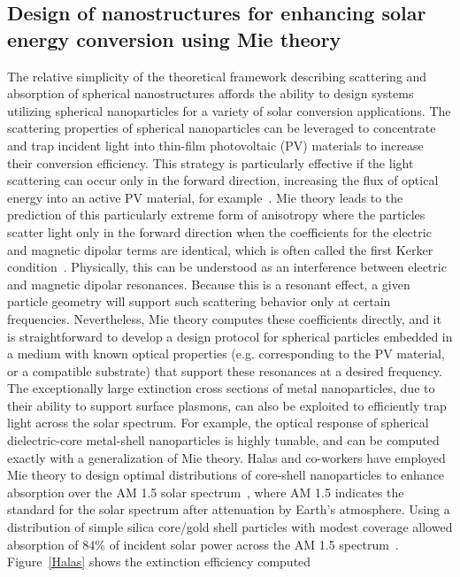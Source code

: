 \documentclass[review]{elsarticle}
\begin{document}
\subsection{Design of nanostructures for enhancing solar energy conversion using Mie theory}
The relative simplicity of the theoretical framework describing scattering and absorption of spherical 
nanostructures affords the ability to design
systems utilizing spherical nanoparticles for a variety of solar conversion applications.  The scattering properties of
spherical nanoparticles can be leveraged to concentrate and trap incident light into thin-film photovoltaic (PV) materials to increase their
conversion efficiency.  This strategy is particularly effective if the light scattering can occur only in the forward direction, increasing
the flux of optical energy into an active PV material, for example~\cite{AP_NatMat_2010}.
Mie theory
leads to the prediction of this particularly extreme form of anisotropy where the particles scatter light only in the
forward direction when the coefficients for the electric and magnetic dipolar terms are identical, which is often called the first Kerker condition~\cite{GGG_NatComm_2012}.
Physically, this can be understood as an interference between electric
and magnetic dipolar resonances.   Because this is a resonant effect, a given particle geometry will support such scattering behavior
only at certain frequencies.  Nevertheless, Mie theory computes these coefficients directly, and it is straightforward to develop a
design protocol for spherical particles embedded in a medium with known optical properties (e.g. corresponding to the PV material, or a
compatible substrate) that support these resonances at a desired frequency.  The exceptionally large extinction cross sections
of metal nanoparticles, due to their ability to support surface plasmons, can also be exploited to efficiently trap light across
the solar spectrum.  For example, the optical response of spherical dielectric-core metal-shell nanoparticles is highly tunable, and can be
computed exactly with a generalization of Mie theory.  Halas and co-workers have employed Mie theory to
design optimal distributions of core-shell nanoparticles to enhance absorption over the AM 1.5 solar 
spectrum~\cite{CH_APL_2006}, where AM 1.5 indicates the standard for the solar 
spectrum after attenuation by Earth's atmosphere.
Using a distribution of simple silica core/gold shell particles with modest coverage allowed absorption of 84\% of incident solar power
across the AM 1.5 spectrum~\cite{CH_APL_2006}.  Figure~\ref{Halas} shows the extinction efficiency computed
\end{document}
